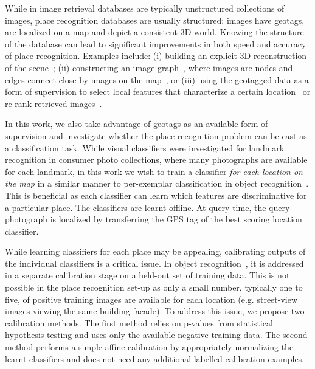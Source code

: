    While in image retrieval  databases are typically unstructured collections of images, place recognition databases are usually structured: images have geotags, are localized on a map and depict a consistent 3D world. %
   Knowing the structure of the database can lead to significant improvements in both speed and accuracy of place recognition. 
   Examples include: (i) building an explicit 3D reconstruction of the scene~\cite{Irschara2009,Li10,Li12}; (ii) constructing an image graph~\cite{Cao13,Philbin10c,Turcot09}, where images are nodes and edges connect close-by images on the map~\cite{Torii11}, or (iii) using the geotagged data as a form of supervision to select local features that characterize a certain location~\cite{Knopp2010,Schindler07} or re-rank retrieved images~\cite{Zamir10}.

   In this work, we also take advantage of geotags as an available form of supervision and investigate whether the place recognition problem can be cast as a classification task.
   While visual classifiers were investigated for landmark \cite{Li09} recognition in consumer photo collections, where many photographs are available for each landmark, in this work we wish to train a classifier {\em for each location on the map} in a similar manner to per-exemplar classification in object recognition~\cite{Malisiewicz11}. This is beneficial as  each classifier can learn which features are discriminative for a particular place. %
   The classifiers are learnt offline. At query time, the query photograph is localized by transferring the GPS tag of the best scoring location classifier.

   While learning classifiers for each place may be appealing, calibrating outputs of the individual classifiers is a critical issue. In object recognition~\cite{Malisiewicz11}, it is addressed in a separate calibration stage on a held-out set of training data.
   This is not possible in the place recognition set-up as only a small number, typically one to five, of positive training images are available for each location (e.g. street-view images viewing the same building facade). To address this issue, we propose two calibration methods. 
The first method relies on p-values from statistical hypothesis testing and uses only the available negative training data. The second method performs a simple affine calibration by appropriately normalizing the learnt classifiers and does not need any additional labelled calibration examples.   

